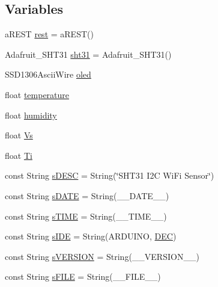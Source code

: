 \subsection*{Variables}
\begin{DoxyCompactItemize}
\item 
a\-R\-E\-S\-T \hyperlink{Yun__SHT31__WiFi__REST_8ino_a26fae33ed4ee26417d9384858ac417f7}{rest} = a\-R\-E\-S\-T()
\item 
Adafruit\-\_\-\-S\-H\-T31 \hyperlink{Yun__SHT31__WiFi__REST_8ino_a4cc868f67bc519384a9e92cd96d408c9}{sht31} = Adafruit\-\_\-\-S\-H\-T31()
\item 
S\-S\-D1306\-Ascii\-Wire \hyperlink{Yun__SHT31__WiFi__REST_8ino_ad5f8b489b649f5974de70af2a799aee4}{oled}
\item 
float \hyperlink{Yun__SHT31__WiFi__REST_8ino_afc1d28cfbce795d6ea954ebe725241f5}{temperature}
\item 
float \hyperlink{Yun__SHT31__WiFi__REST_8ino_a6a87b2b0cff24d38b367ccd34843a206}{humidity}
\item 
float \hyperlink{Yun__SHT31__WiFi__REST_8ino_a330b84cf62d5ff4d105603b4aeb5b0f4}{Vs}
\item 
float \hyperlink{Yun__SHT31__WiFi__REST_8ino_a020447fde7d6f0d08fcf2f0d937dac8b}{Ti}
\item 
const String \hyperlink{Yun__SHT31__WiFi__REST_8ino_af834f051d722dbb35b72622ba5b6e7f0}{s\-D\-E\-S\-C} = String(\char`\"{}S\-H\-T31 I2\-C Wi\-Fi Sensor\char`\"{})
\item 
const String \hyperlink{Yun__SHT31__WiFi__REST_8ino_aebbbc07d1cec3118849700c029385aca}{s\-D\-A\-T\-E} = String(\-\_\-\-\_\-\-D\-A\-T\-E\-\_\-\-\_\-)
\item 
const String \hyperlink{Yun__SHT31__WiFi__REST_8ino_aaba6e31d86fe58b0db043f3b487b29ff}{s\-T\-I\-M\-E} = String(\-\_\-\-\_\-\-T\-I\-M\-E\-\_\-\-\_\-)
\item 
const String \hyperlink{Yun__SHT31__WiFi__REST_8ino_a00e4b83e0d8cd98e4f68b1517fa4c815}{s\-I\-D\-E} = String(A\-R\-D\-U\-I\-N\-O, \hyperlink{Print_8h_afe38ec6126e35e40049e27fdf4586ba5}{D\-E\-C})
\item 
const String \hyperlink{Yun__SHT31__WiFi__REST_8ino_a0a1aeee9eb1bf0a5b6fee51ac230a8f6}{s\-V\-E\-R\-S\-I\-O\-N} = String(\-\_\-\-\_\-\-V\-E\-R\-S\-I\-O\-N\-\_\-\-\_\-)
\item 
const String \hyperlink{Yun__SHT31__WiFi__REST_8ino_a71fe64d7daf0e26886ad2d7e17bd0806}{s\-F\-I\-L\-E} = String(\-\_\-\-\_\-\-F\-I\-L\-E\-\_\-\-\_\-)
\end{DoxyCompactItemize}



